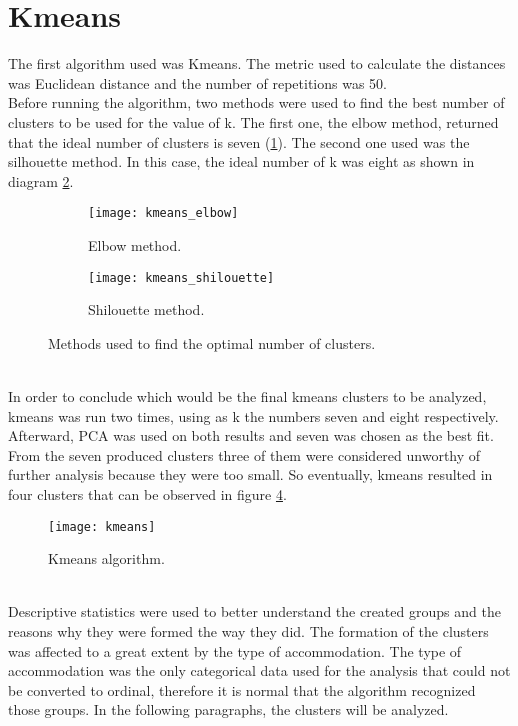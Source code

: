 \section{Kmeans}
The first algorithm used was Kmeans. The metric used to calculate the distances was Euclidean distance and the number of repetitions was 50. \\
Before running the algorithm, two methods were used to find the best number of clusters to be used for the value of k. The first one, the elbow method, returned that the ideal number of clusters is seven (\ref{fig:elbow}). The second one used was the silhouette method. In this case, the ideal number of k was eight as shown in diagram \ref{fig:shilouette}.
\begin{figure}[ht]
\centering
\begin{subfigure}{.5\textwidth}
\centering
\texttt{[image: kmeans\_elbow]}
\caption{Elbow method.}
\label{fig:elbow}
\end{subfigure}%
\begin{subfigure}{.5\textwidth}
\centering
\texttt{[image: kmeans\_shilouette]}
\caption{Shilouette method.}
\label{fig:shilouette}
\end{subfigure}%
\caption{Methods used to find the optimal number of clusters.}
\label{fig:methods}
\end{figure}
\\
In order to conclude which would be the final kmeans clusters to be analyzed, kmeans was run two times, using as k the numbers seven and eight respectively. Afterward, PCA was used on both results and seven was chosen as the best fit. From the seven produced clusters three of them were considered unworthy of further analysis because they were too small. So eventually, kmeans resulted in four clusters that can be observed in figure \ref{fig:kmeans}. \\
\begin{figure}[ht]
\centering
\texttt{[image: kmeans]}
\caption{Kmeans algorithm.}
\label{fig:kmeans}
\end{figure}
\\
Descriptive statistics were used to better understand the created groups and the reasons why they were formed the way they did. The formation of the clusters was affected to a great extent by the type of accommodation. The type of accommodation was the only categorical data used for the analysis that could not be converted to ordinal, therefore it is normal that the algorithm recognized those groups. In the following paragraphs, the clusters will be analyzed. \\
